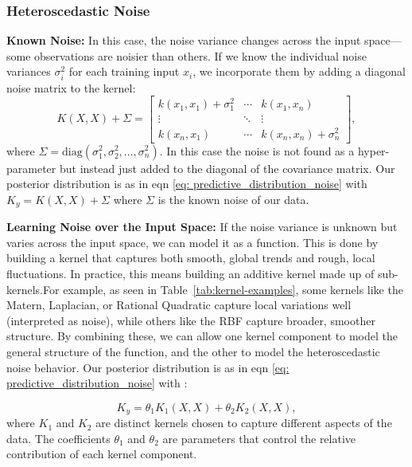 \documentclass[12pt]{article}
\begin{document}
\subsubsection*{Heteroscedastic Noise}  
\textbf{Known Noise:}
%
In this case, the noise variance changes across the input space—some observations are noisier than others. If we know the individual noise variances \( \sigma_i^2 \) for each training input \( x_i \), we incorporate them by adding a diagonal noise matrix to the kernel:
\[
K(X, X) + \Sigma = 
\begin{bmatrix}
k(x_1, x_1) + \sigma_1^2 & \cdots & k(x_1, x_n) \\
\vdots & \ddots & \vdots \\
k(x_n, x_1) & \cdots & k(x_n, x_n) + \sigma_n^2
\end{bmatrix},
\]
where \( \Sigma = \text{diag}(\sigma_1^2, \sigma_2^2, \dots, \sigma_n^2) \).
In this case the noise is not found as a hyper-parameter but instead just added to the diagonal of the covariance matrix.
Our posterior distribution is as in eqn \ref{eq:  predictive_distribution_noise} with \(K_y =K(X, X) + \Sigma \) where \(\Sigma\) is the known noise of our data. 

\vspace{1em}
\noindent
\textbf{Learning Noise over the Input Space:}
%
If the noise variance is unknown but varies across the input space, we can model it as a function. 
This is done by building a kernel that captures both smooth, global trends and rough, local fluctuations. 
In practice, this means building an additive kernel made up of sub-kernels.For example, as seen in Table~\ref{tab:kernel-examples}, some kernels like the Matern, Laplacian, or Rational Quadratic capture local variations well (interpreted as noise),
while others like the RBF capture broader, smoother structure. By combining these, we can allow one kernel component to model the general structure of the function, and the other to model the heteroscedastic noise behavior. 
Our posterior distribution is as in eqn \ref{eq:  predictive_distribution_noise} with :

\begin{equation}
    K_y = \theta_1 K_1(X, X) + \theta_2 K_2(X, X),
    \label{eq:additive_kernel}
\end{equation}
where \( K_1 \) and \( K_2 \) are distinct kernels chosen to capture different aspects of the data. 
The coefficients \( \theta_1 \) and \( \theta_2 \) are parameters that control the relative contribution of each kernel component.
\end{document}
